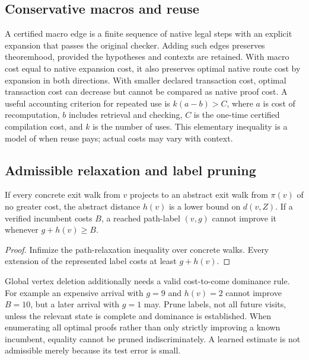 \documentclass[11pt]{article}
\theoremstyle{definition}\newtheorem{definition}[theorem]{Definition}\newtheorem{example}[theorem]{Example}\newtheorem{conjecture}[theorem]{Conjecture}
\begin{document}
\subsection{Conservative macros and reuse}
A certified macro edge is a finite sequence of native legal steps with an explicit expansion that passes the original checker. Adding such edges preserves theoremhood, provided the hypotheses and contexts are retained. With macro cost equal to native expansion cost, it also preserves optimal native route cost by expansion in both directions. With smaller declared transaction cost, optimal transaction cost can decrease but cannot be compared as native proof cost. A useful accounting criterion for repeated use is $k(a-b)>C$, where $a$ is cost of recomputation, $b$ includes retrieval and checking, $C$ is the one-time certified compilation cost, and $k$ is the number of uses. This elementary inequality is a model of when reuse pays; actual costs may vary with context.
\subsection{Admissible relaxation and label pruning}
\begin{proposition}
If every concrete exit walk from $v$ projects to an abstract exit walk from $\pi(v)$ of no greater cost, the abstract distance $h(v)$ is a lower bound on $d(v,Z)$. If a verified incumbent costs $B$, a reached path-label $(v,g)$ cannot improve it whenever $g+h(v)\ge B$.
\end{proposition}
\begin{proof} Infimize the path-relaxation inequality over concrete walks. Every extension of the represented label costs at least $g+h(v)$.\end{proof}
Global vertex deletion additionally needs a valid cost-to-come dominance rule. For example an expensive arrival with $g=9$ and $h(v)=2$ cannot improve $B=10$, but a later arrival with $g=1$ may. Prune labels, not all future visits, unless the relevant state is complete and dominance is established. When enumerating all optimal proofs rather than only strictly improving a known incumbent, equality cannot be pruned indiscriminately. A learned estimate is not admissible merely because its test error is small.
\end{document}
